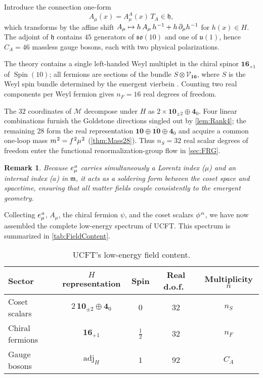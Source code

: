 \documentclass[pdflatex,sn-mathphys-num]{sn-jnl}
\theoremstyle{thmstyleone}
\theoremstyle{thmstyletwo}%
\newtheorem{remark}{Remark}%
\theoremstyle{thmstylethree}%
\newcommand{\M}{\mathcal{M}}
\newcommand{\sm}{\hspace{.065em}}
\newcommand{\Spin}{\operatorname{Spin}}
\newcommand{\smexp}[1]{^{\sm #1}}
\renewcommand{\arraystretch}{1.25}
\begin{document}
Introduce the connection one-form
\begin{equation}\label{eq:GaugeConnection}
  A_{\mu}(x)=A_{\mu}^{A}(x)\,T_{A}\in\mathfrak h,
\end{equation}
which transforms by the affine shift
\(
  A_{\mu}\mapsto h\,A_{\mu}\,h\smexp{-1}+h\,\partial_{\mu}h\smexp{-1}
\)
for $h(x)\in H$.  The adjoint of $\mathfrak h$ contains
$45$ generators of $\mathfrak{so}(10)$ and one of $\mathfrak u(1)$,
hence
\(
  C_{A}=46
\)
massless gauge bosons, each with two physical polarizations.

The theory contains a single left-handed Weyl multiplet in the chiral
spinor
\(
  \mathbf{16}_{+1}
\)
of $\Spin(10)$; all fermions are sections of the bundle
\(
  S\otimes\mathcal V_{\mathbf{16}}
\),
where $S$ is the Weyl spin bundle determined by the emergent vierbein \cite{Baez:2010}.  Counting two real components per Weyl fermion gives
\(
  n_{F}=16
\)
real degrees of freedom.

The $32$ coordinates of $\M$ decompose under $H$ as
\(
  2\times\mathbf{10}_{\pm2}\oplus\mathbf4_{0}
\). Four linear combinations furnish the Goldstone directions singled out by \autoref{lem:Rank4}; the remaining 28 form the real representation
\(
  \mathbf{10}\oplus\overline{\mathbf{10}}\oplus\mathbf4_{0}
\)
and acquire a common one-loop mass
\(
  m\smexp{2}=f\smexp{2}\mu\smexp{2}
\)
(\autoref{thm:Mass28}). Thus
\(
  n_{S}=32
\)
real scalar degrees of freedom enter the functional
renormalization-group flow in \autoref{sec:FRG}.

\begin{remark}\label{rmk:Soldering}
Because $e_{\mu}\smexp{ a}$ carries simultaneously a Lorentz index
($\mu$) and an internal index ($a$) in $\mathfrak m$, it acts as a
soldering form between the coset space and spacetime, ensuring
that all matter fields couple consistently to the emergent geometry.
\end{remark}

Collecting $e_{\mu}\smexp{ a}$, $A_{\mu}$, the chiral fermion
$\psi$, and the coset scalars $\phi\smexp{\alpha}$, we have now assembled the
complete low-energy spectrum of UCFT. This spectrum is summarized in \autoref{tab:FieldContent}.

\begin{table}[h]
\centering
\caption{UCFT's low-energy field content.}
\label{tab:FieldContent}
\renewcommand{\arraystretch}{1.25}
\begin{tabular}{@{}lcccc@{}}
\toprule
Sector & $H$ representation & Spin & Real d.o.f.\ & Multiplicity $n$ \\
\midrule
Coset scalars & $2\,\mathbf{10}_{\pm2}\oplus\mathbf4_{0}$ & $0$ & $32$ & $n_{S}$ \\
Chiral fermions & $\mathbf{16}_{+1}$ & $\tfrac12$ & $32$ & $n_{F}$ \\
Gauge bosons & $\mathrm{adj}_{H}$ & $1$ & $92$ & $C_{A}$ \\
\bottomrule
\end{tabular}
\end{table}
\end{document}
